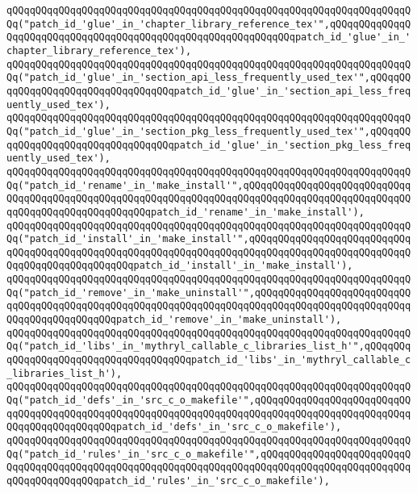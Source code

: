 \verb|qQQqqQQqqQQqqQQqqQQqqQQqqQQqqQQqqQQqqQQqqQQqqQQqqQQqqQQqqQQqqQQqqQQqqQQq("patch_id_'glue'_in_'chapter_library_reference_tex'",qQQqqQQqqQQqqQQqqQQqqQQqqQQqqQQqqQQqqQQqqQQqqQQqqQQqqQQqqQQqqQQqpatch_id_'glue'_in_'chapter_library_reference_tex'),|\newline
\verb|qQQqqQQqqQQqqQQqqQQqqQQqqQQqqQQqqQQqqQQqqQQqqQQqqQQqqQQqqQQqqQQqqQQqqQQq("patch_id_'glue'_in_'section_api_less_frequently_used_tex'",qQQqqQQqqQQqqQQqqQQqqQQqqQQqqQQqqQQqpatch_id_'glue'_in_'section_api_less_frequently_used_tex'),|\newline
\verb|qQQqqQQqqQQqqQQqqQQqqQQqqQQqqQQqqQQqqQQqqQQqqQQqqQQqqQQqqQQqqQQqqQQqqQQq("patch_id_'glue'_in_'section_pkg_less_frequently_used_tex'",qQQqqQQqqQQqqQQqqQQqqQQqqQQqqQQqqQQqpatch_id_'glue'_in_'section_pkg_less_frequently_used_tex'),|\newline
\verb|qQQqqQQqqQQqqQQqqQQqqQQqqQQqqQQqqQQqqQQqqQQqqQQqqQQqqQQqqQQqqQQqqQQqqQQq("patch_id_'rename'_in_'make_install'",qQQqqQQqqQQqqQQqqQQqqQQqqQQqqQQqqQQqqQQqqQQqqQQqqQQqqQQqqQQqqQQqqQQqqQQqqQQqqQQqqQQqqQQqqQQqqQQqqQQqqQQqqQQqqQQqqQQqqQQqqQQqpatch_id_'rename'_in_'make_install'),|\newline
\verb|qQQqqQQqqQQqqQQqqQQqqQQqqQQqqQQqqQQqqQQqqQQqqQQqqQQqqQQqqQQqqQQqqQQqqQQq("patch_id_'install'_in_'make_install'",qQQqqQQqqQQqqQQqqQQqqQQqqQQqqQQqqQQqqQQqqQQqqQQqqQQqqQQqqQQqqQQqqQQqqQQqqQQqqQQqqQQqqQQqqQQqqQQqqQQqqQQqqQQqqQQqqQQqqQQqpatch_id_'install'_in_'make_install'),|\newline
\verb|qQQqqQQqqQQqqQQqqQQqqQQqqQQqqQQqqQQqqQQqqQQqqQQqqQQqqQQqqQQqqQQqqQQqqQQq("patch_id_'remove'_in_'make_uninstall'",qQQqqQQqqQQqqQQqqQQqqQQqqQQqqQQqqQQqqQQqqQQqqQQqqQQqqQQqqQQqqQQqqQQqqQQqqQQqqQQqqQQqqQQqqQQqqQQqqQQqqQQqqQQqqQQqqQQqpatch_id_'remove'_in_'make_uninstall'),|\newline
\verb|qQQqqQQqqQQqqQQqqQQqqQQqqQQqqQQqqQQqqQQqqQQqqQQqqQQqqQQqqQQqqQQqqQQqqQQq("patch_id_'libs'_in_'mythryl_callable_c_libraries_list_h'",qQQqqQQqqQQqqQQqqQQqqQQqqQQqqQQqqQQqqQQqpatch_id_'libs'_in_'mythryl_callable_c_libraries_list_h'),|\newline
\verb|qQQqqQQqqQQqqQQqqQQqqQQqqQQqqQQqqQQqqQQqqQQqqQQqqQQqqQQqqQQqqQQqqQQqqQQq("patch_id_'defs'_in_'src_c_o_makefile'",qQQqqQQqqQQqqQQqqQQqqQQqqQQqqQQqqQQqqQQqqQQqqQQqqQQqqQQqqQQqqQQqqQQqqQQqqQQqqQQqqQQqqQQqqQQqqQQqqQQqqQQqqQQqqQQqqQQqpatch_id_'defs'_in_'src_c_o_makefile'),|\newline
\verb|qQQqqQQqqQQqqQQqqQQqqQQqqQQqqQQqqQQqqQQqqQQqqQQqqQQqqQQqqQQqqQQqqQQqqQQq("patch_id_'rules'_in_'src_c_o_makefile'",qQQqqQQqqQQqqQQqqQQqqQQqqQQqqQQqqQQqqQQqqQQqqQQqqQQqqQQqqQQqqQQqqQQqqQQqqQQqqQQqqQQqqQQqqQQqqQQqqQQqqQQqqQQqqQQqpatch_id_'rules'_in_'src_c_o_makefile'),|\newline
